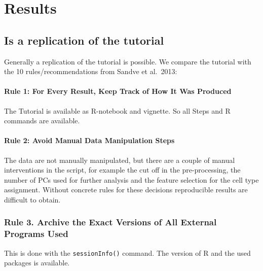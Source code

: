 \documentclass[a4paper, 10pt]{scrartcl}
\begin{document}
\hypertarget{results}{%
\section{Results}\label{results}}

\hypertarget{is-a-replication-of-the-tutorial}{%
\subsection{Is a replication of the
tutorial}\label{is-a-replication-of-the-tutorial}}

Generally a replication of the tutorial is possible. We compare the
tutorial with the 10 rules/recommendations from Sandve et al.~2013:

\hypertarget{rule-1-for-every-result-keep-track-of-how-it-was-produced}{%
\paragraph{Rule 1: For Every Result, Keep Track of How It Was
Produced}\label{rule-1-for-every-result-keep-track-of-how-it-was-produced}}

The Tutorial is available as R-notebook and vignette. So all Steps and R
commands are available.

\hypertarget{rule-2-avoid-manual-data-manipulation-steps}{%
\paragraph{Rule 2: Avoid Manual Data Manipulation
Steps}\label{rule-2-avoid-manual-data-manipulation-steps}}

The data are not manually manipulated, but there are a couple of manual
interventions in the script, for example the cut off in the
pre-processing, the number of PCs used for further analysis and the
feature selection for the cell type assignment. Without concrete rules
for these decisions reproducible results are difficult to obtain.

\hypertarget{rule-3.-archive-the-exact-versions-of-all-external-programs-used}{%
\subsubsection{Rule 3. Archive the Exact Versions of All External
Programs
Used}\label{rule-3.-archive-the-exact-versions-of-all-external-programs-used}}

This is done with the \texttt{sessionInfo()} command. The version of R
and the used packages is available.
\end{document}
